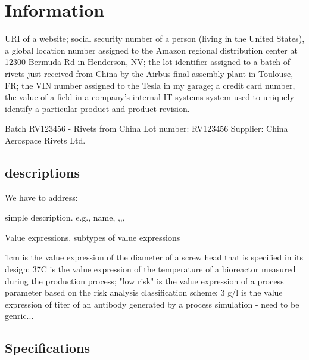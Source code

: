 \chapter{Information}



URI of a website; social security number of a person (living in the United States), a global location number assigned to the Amazon regional distribution center at 12300 Bermuda Rd in Henderson, NV; the lot identifier assigned to a batch of rivets just received from China by the Airbus final assembly plant in Toulouse, FR; the VIN number assigned to the Tesla in my garage; a credit card number, the value of a field in a company's internal IT systems system used to uniquely identify a particular product and product revision.

Batch RV123456 - Rivets from China Lot number: RV123456
Supplier: China Aerospace Rivets Ltd. 

\section{descriptions}

We have to address:

simple description. e.g., name, ,,,

Value expressions. subtypes of value expressions

1cm is the value expression of the diameter of a screw head that is specified in its design; 37C is the value expression of the temperature of a bioreactor measured during the production process; "low risk" is the value expression of a process parameter based on the risk analysis classification scheme; 3 g/l is the value expression of titer of an antibody generated by a process simulation - need to be genric...


\section{Specifications}